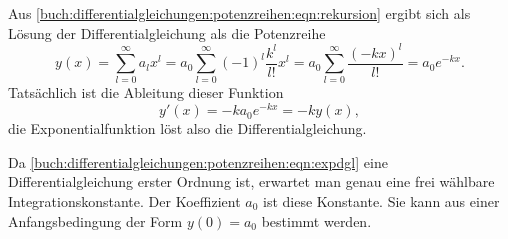 Aus \eqref{buch:differentialgleichungen:potenzreihen:eqn:rekursion}
ergibt sich als Lösung der Differentialgleichung als die Potenzreihe
\[
y(x)
=
\sum_{l=0}^\infty a_lx^l
=
a_0
\sum_{l=0}^\infty
(-1)^l
\frac{k^l}{l!}x^l
=
a_0
\sum_{l=0}^\infty
\frac{(-kx)^l}{l!}
=
a_0e^{-kx}.
\]
Tatsächlich ist die Ableitung dieser Funktion
\[
y'(x)
=
-ka_0e^{-kx}
=
-ky(x),
\]
die Exponentialfunktion löst also die Differentialgleichung.

Da 
\eqref{buch:differentialgleichungen:potenzreihen:eqn:expdgl}
eine Differentialgleichung erster Ordnung ist, erwartet man 
genau eine frei wählbare Integrationskonstante.
Der Koeffizient $a_0$ ist diese Konstante.
Sie kann aus einer Anfangsbedingung der Form $y(0)=a_0$ bestimmt werden.
